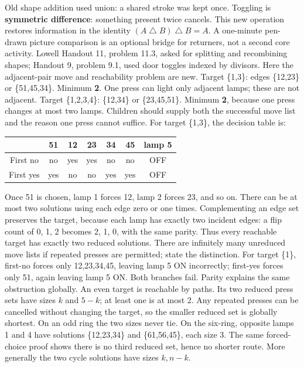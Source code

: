 \documentclass[12pt]{extarticle}
\begin{document}
Old shape addition used union: a shared stroke was kept once. Toggling is \textbf{symmetric difference}: something present twice cancels. This new operation restores information in the identity \((A\mathbin{\triangle}B)\mathbin{\triangle}B=A\). A one-minute pen-drawn picture comparison is an optional bridge for returners, not a second core activity. Lowell Handout 11, problem 11.3, asked for splitting and recombining shapes; Handout 9, problem 9.1, used door toggles indexed by divisors. Here the adjacent-pair move and reachability problem are new.
\newpage
{}
Target \{1,3\}: edges \{12,23\} or \{51,45,34\}. Minimum \textbf{2}. One press can light only adjacent lamps; these are not adjacent. Target \{1,2,3,4\}: \{12,34\} or \{23,45,51\}. Minimum \textbf{2}, because one press changes at most two lamps. Children should supply both the successful move list and the reason one press cannot suffice.
For target \{1,3\}, the decision table is:
\begin{center}\renewcommand{\arraystretch}{1.4}\begin{tabular}{c|ccccc|c}&51&12&23&34&45&lamp 5\\\hline First no&no&yes&yes&no&no&OFF\\First yes&yes&no&no&yes&yes&OFF\end{tabular}\end{center}
Once 51 is chosen, lamp 1 forces 12, lamp 2 forces 23, and so on. There can be at most two solutions using each edge zero or one times. Complementing an edge set preserves the target, because each lamp has exactly two incident edges: a flip count of 0, 1, 2 becomes 2, 1, 0, with the same parity. Thus every reachable target has exactly two reduced solutions. There are infinitely many unreduced move lists if repeated presses are permitted; state the distinction.
For target \{1\}, first-no forces only 12,23,34,45, leaving lamp 5 ON incorrectly; first-yes forces only 51, again leaving lamp 5 ON. Both branches fail. Parity explains the same obstruction globally.
An even target is reachable by paths. Its two reduced press sets have sizes \(k\) and \(5-k\); at least one is at most 2. Any repeated presses can be cancelled without changing the target, so the smaller reduced set is globally shortest. On an odd ring the two sizes never tie. On the six-ring, opposite lamps 1 and 4 have solutions \{12,23,34\} and \{61,56,45\}, each size 3. The same forced-choice proof shows there is no third reduced set, hence no shorter route. More generally the two cycle solutions have sizes \(k,n-k\).
\end{document}
